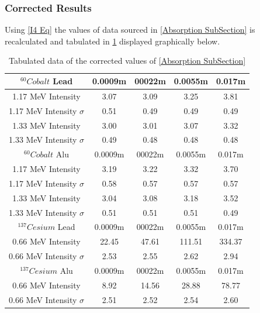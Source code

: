 \documentclass[12pt]{article}
\begin{document}
\subsubsection{Corrected Results}
\label{Corrected Results SubsubSection}

Using \cref{I4 Eq} the values of data sourced in \cref{Absorption SubSection} is recalculated and tabulated in \cref{Corrected Data} displayed graphically below. 
 
\begin{table}[H]
\begin{center}
 \footnotesize
 \begin{tabular}{|c||c|c|c|c|}
 \hline
 $^{60}Cobalt$ Lead & 0.0009m & 00022m & 0.0055m & 0.017m \\
 \hline
 1.17 MeV Intensity & 3.07 & 3.09 & 3.25 & 3.81 \\
 \hline
 1.17 MeV Intensity $\sigma$ & 0.51 & 0.49 & 0.49 & 0.49 \\
 \hline
 1.33 MeV Intensity & 3.00 & 3.01 & 3.07 & 3.32 \\
 \hline
 1.33 MeV Intensity $\sigma$ & 0.49 & 0.48 & 0.48 & 0.48 \\
 \hline \hline
  $^{60}Cobalt$ Alu & 0.0009m & 00022m & 0.0055m & 0.017m \\
 \hline
 1.17 MeV Intensity & 3.19 & 3.22 & 3.32 & 3.70 \\
 \hline
 1.17 MeV Intensity $\sigma$ & 0.58 & 0.57 & 0.57 & 0.57 \\
 \hline
 1.33 MeV Intensity & 3.04 & 3.08 & 3.18 & 3.52 \\
 \hline
 1.33 MeV Intensity $\sigma$ & 0.51 & 0.51 & 0.51 & 0.49 \\
 \hline \hline
  $^{137}Cesium$ Lead & 0.0009m & 00022m & 0.0055m & 0.017m \\
 \hline
 0.66 MeV Intensity & 22.45 & 47.61 & 111.51 & 334.37 \\
 \hline
 0.66 MeV Intensity $\sigma$ & 2.53 & 2.55 & 2.62 & 2.94 \\
 \hline \hline
 $^{137}Cesium$ Alu & 0.0009m & 00022m & 0.0055m & 0.017m \\
 \hline
 0.66 MeV Intensity & 8.92 & 14.56 & 28.88 & 78.77 \\
 \hline
 0.66 MeV Intensity $\sigma$ & 2.51 & 2.52 & 2.54 & 2.60 \\
 \hline
 \end{tabular} \\ 
 \caption{Tabulated data of the corrected values of \cref{Absorption SubSection}}
 \label{Corrected Data}
\end{center}
\end{table}
\end{document}
